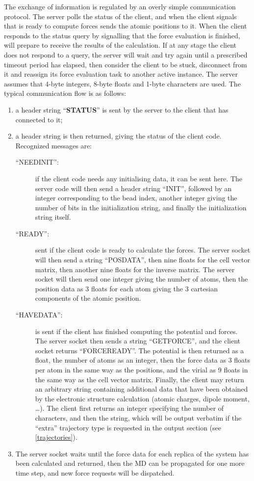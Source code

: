 \documentclass[11pt,english,fleqn]{report}
\begin{document}
The exchange of information is regulated by an overly simple 
communication protocol. The server polls the status of the client,
and when the client signals that is ready to compute forces 
\ipi sends the atomic positions to it. When the client responds to the
status query by signalling that the force evaluation is finished,
\ipi will prepare to receive the results of the calculation.
 If at any stage the client does not respond to a query, the server 
will wait and try again until a prescribed timeout period has elapsed, 
then consider the client to be stuck, disconnect from it 
and reassign its force evaluation task to another active instance. 
The server assumes that 4-byte integers, 8-byte floats
and 1-byte characters are used. The typical communication flow is
as follows:
%
\begin{enumerate}
\item a header string {}``\textbf{STATUS}'' is sent by the server to 
the client that has connected to it;
\item a header string is then returned, giving the status of the client
code. Recognized messages are:
\begin{description}
\item [{{}``NEEDINIT'':}] if the client code needs any initialising data,
it can be sent here. The server code will then send a header string
{}``INIT'', followed by an integer corresponding to the bead index,
another integer giving the number of bits in
the initialization string, and finally the initialization string itself.
\item [{{}``READY'':}] sent if the client code is ready to calculate
the forces. The server socket will then send a string {}``POSDATA'',
then nine floats for the cell vector matrix, then another nine floats
for the inverse matrix. The server socket will then send one
integer giving the number of atoms, then the position data as 3 floats
for each atom giving the 3 cartesian components of the atomic position.
\item [{{}``HAVEDATA'':}] is sent if the client has finished computing the
potential and forces. The server socket then sends a string {}``GETFORCE'',
and the client socket returns {}``FORCEREADY''. The potential is
then returned as a float, the number of atoms as an integer, then
the force data as 3 floats per atom in the same way as the positions,
and the virial as 9 floats in the same way as the cell vector matrix. 
Finally, the client may return an arbitrary string containing additional
data that have been obtained by the electronic structure calculation 
(atomic charges, dipole moment, \ldots). The client first returns
an integer specifying the number of characters, and then the string,
which will be output verbatim if the ``extra'' trajectory type is
requested in the output section (see \ref{trajectories}).

\end{description}
\item The server socket waits until the force data for each replica of the
system has been calculated and returned, then the MD can be propagated for
one more time step, and new force requests will be dispatched.
\end{enumerate}
\end{document}
